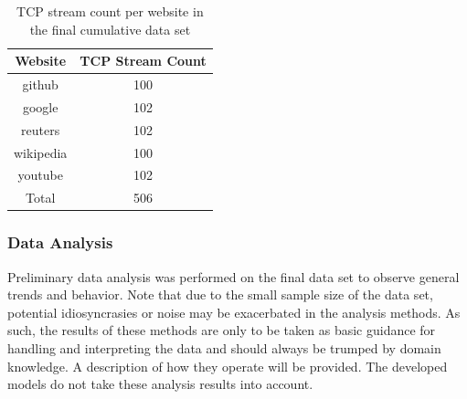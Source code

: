 \documentclass[10pt,sigconf,letterpaper,nonacm]{acmart}
\begin{document}
\begin{table}[h]
  \caption{TCP stream count per website in the final cumulative data set}
  \label{tab:dataSize}
  \begin{tabular}{cc}
    \toprule
    Website & TCP Stream Count \\
    \midrule
    github & 100 \\
    google & 102 \\
    reuters & 102 \\
    wikipedia & 100 \\
    youtube & 102 \\
    \midrule
    Total & 506 \\
    \bottomrule
  \end{tabular}
\end{table}

\subsubsection{Data Analysis}

Preliminary data analysis was performed on the final data set to observe general trends and behavior.
Note that due to the small sample size of the data set, potential idiosyncrasies or noise may be exacerbated in the analysis methods.
As such, the results of these methods are only to be taken as basic guidance for handling and interpreting the data and should always be trumped by domain knowledge.
A description of how they operate will be provided.
The developed models do not take these analysis results into account.
\end{document}
